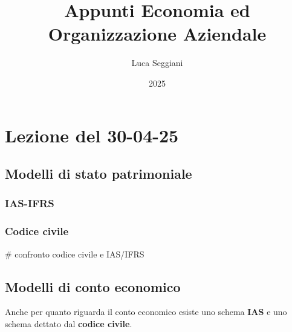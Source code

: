 \documentclass[a4paper,11pt]{article}
\title{Appunti Economia ed Organizzazione Aziendale}
\author{Luca Seggiani}
\date{2025}
\begin{document}
\section{Lezione del 30-04-25}

\thispagestyle{empty}
\pagestyle{fancy}

\subsection{Modelli di stato patrimoniale}

\subsubsection{IAS-IFRS}

\subsubsection{Codice civile}

# confronto codice civile e IAS/IFRS

\subsection{Modelli di conto economico}
Anche per quanto riguarda il conto economico esiste uno schema \textbf{IAS} e uno schema dettato dal \textbf{codice civile}. 
\end{document}
